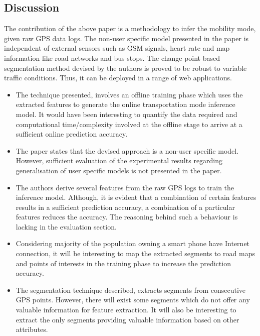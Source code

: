 \subsection{Discussion} \label{lect1-disc}

The contribution of the above paper is a methodology to infer the mobility mode, given raw GPS
data logs. The non-user specific model presented in the paper is independent of external sensors 
such as GSM signals, heart rate and map information like road networks and bus stops. The change 
point based segmentation method devised by the authors is proved to be robust to variable traffic
conditions. Thus, it can be deployed in a range of web applications.      


\begin{itemize}

\item The technique presented, involves an offline training phase which uses the extracted features 
to generate the online transportation mode inference model. It would have been interesting to quantify 
the data required and computational time/complexity involved at the offline stage to arrive at a sufficient
online prediction accuracy.

\item The paper states that the devised approach is a non-user specific model. However, sufficient 
evaluation of the experimental results regarding generalisation of user specific models is not presented
in the paper. 

\item The authors derive several features from the raw GPS logs to train the inference model. Although, 
it is evident that a combination of certain features results in a sufficient prediction accuracy, a 
combination of a particular features reduces the accuracy. The reasoning behind such a behaviour is lacking 
in the evaluation section. 

\item Considering majority of the population owning a smart phone have Internet connection, it will be
interesting to map the extracted segments to road maps and points of interests in the training phase 
to increase the prediction accuracy. 

\item The segmentation technique described, extracts segments from consecutive GPS points. However, there
will exist some segments which do not offer any valuable information for feature extraction. It will 
also be interesting to extract the only segments providing valuable information based on other attributes.   
\end{itemize}